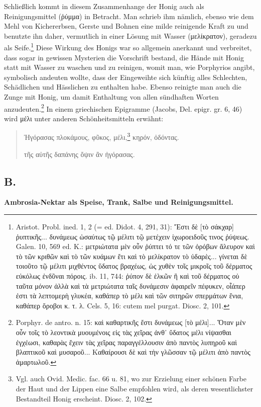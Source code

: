 \documentclass[a4paper, 11pt, oneside]{article}
\begin{document}
Schließlich kommt in diesem Zusammenhange der Honig auch als Reinigungsmittel (ῥύμμα) in Betracht. Man schrieb ihm nämlich, ebenso wie dem Mehl von Kichererbsen, Gerste und Bohnen eine milde reinigende Kraft zu und benutzte ihn daher, vermutlich in einer Lösung mit Wasser (μελίκρατον), geradezu als Seife.\footnote{Aristot. Probl. ined. 1, 2 (= ed. Didot. 4, 291, 31): Ἔστι δὲ [τὸ σάκχαρ] ῤυπτικῆς... δυνάμεως ὡσαύτως τῷ μέλιτι τῷ μετέχειν ἰχωροειδοῦς τινος ῤύψεως. Galen. 10, 569 ed. K.: μετριώτατα μὲν οὖν ῥύπτει τό τε τῶν ὀρόβων ἄλευρον καὶ τὸ τῶν κριθῶν καὶ τὸ τῶν κυάμων ἔτι καὶ τὸ μελίκρατον τὸ ὑδαρὲς... γίνεται δὲ τοιοῦτο τῷ μέλιτι μιχθέντος ὕδατος βραχέως, ὡς χυθὲν τοῖς μικροῖς τοῦ δἐρματος εὐκόλως ἐνδῦναι πόροις. ib. 11, 744: ῥύπον δὲ ἑλκῶν ἢ καὶ τοῦ δέρματος οὐ ταῦτα μόνον ἀλλὰ καὶ τὰ μετριώτατα ταῖς δυνάμεσιν ἀφαιρεῖν πέφυκεν, οἶάπερ ἐστι τὰ λεπτομερὴ γλυκέα, καθάπερ τὸ μέλι καὶ τῶν σιτηρῶν σπερμάτων ἕνια, καθάπερ ὅροβοι κ. τ. λ. Cels. 5, 16: cutem mel purgat. Diosc. 2, 101.} Diese Wirkung des Honigs war so allgemein anerkannt und verbreitet, dass sogar in gewissen Mysterien die Vorschrift bestand, die Hände mit Honig statt mit Wasser zu waschen und zu reinigen, womit man, wie Porphyrios angibt, symbolisch andeuten wollte, dass der Eingeweihte sich künftig alles Schlechten, Schädlichen und Hässlichen zu enthalten habe. Ebenso reinigte man auch die Zunge mit Honig, um damit Enthaltung von allen sündhaften Worten anzudeuten.\footnote{Porphyr. de antro. n. 15: καὶ καθαρτικῆς ἔστι δυνάμεως [τὸ μέλι]... Ὅταν μὲν οὖν τοῖς τὸ λεοντικὰ μυουμένοις εἰς τὰς χεῖρας ἀνθ᾽ ὕδατος μέλι νίψασθαι ἐγχέωσι, καθαρὰς ἔχειν τὰς χεῖρας παραγγέλλουσιν ἀπὸ παντὸς λυπηροῦ καὶ βλαπτικοῦ καὶ μυσαροῦ... Καθαίρουσι δὲ καὶ τὴν γλῶσσαν τῷ μέλιτι ἀπὸ παντὸς ἁμαρτωλοῦ.} In einem griechischen Epigramme (Jacobs, Del. epigr. gr. 6, 46) wird μέλι unter anderen Schönheitsmitteln erwähnt:
\begin{quotation}
Ἠγόρασας πλοκάμους, φῦκος, μέλι,\footnote{Vgl. auch Ovid. Medic. fac. 66 u. 81, wo zur Erzielung einer schönen Farbe der Haut und der Lippen eine Salbe empfohlen wird, als deren wesentlichster Bestandteil Honig erscheint. Diosc. 2, 102.} κηρόν, ὀδόντας.

τῆς αὐτῆς δαπάνης ὄψιν ἂν ἠγόρασας.
\end{quotation}
\paragraph{}
\subsection{B.}
\begin{center}
\textbf{Ambrosia-Nektar als Speise, Trank, Salbe und Reinigungsmittel.}
\end{center}
\end{document}
